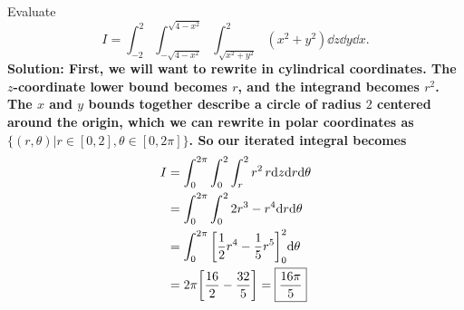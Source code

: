 \begin{example}
    Evaluate 
    \[ I = \int_{-2}^2\int_{-\sqrt{4-x^2}}^{\sqrt{4-x^2}}\int_{\sqrt{x^2+y^2}}^{2}(x^2+y^2)\dd z\dd y\dd x. \]
    \bf{Solution: }First, we will want to rewrite in cylindrical coordinates. The $z$-coordinate lower bound becomes $r$, and the integrand becomes $r^2$. The $x$ and $y$ bounds together describe a circle of radius $2$ centered around the origin, which we can rewrite in polar coordinates as $\{(r,\theta)|r\in[0,2], \theta\in[0,2\pi] \}$. So our iterated integral becomes
    \begin{align*}
        I &= \int_0^{2\pi}\int_0^2\int_r^2r^2\, r\dd z\dd r\dd \theta \\
        &= \int_0^{2\pi}\int_0^2 2r^3-r^4\dd r\dd \theta \\
        &= \int_0^{2\pi}\bqty{\frac{1}{2}r^4-\frac{1}{5}r^5}_0^2\dd\theta \\
        &= 2\pi\bqty{\frac{16}{2}-\frac{32}{5}} = \boxed{\frac{16\pi}{5}}
    \end{align*}
\end{example}
